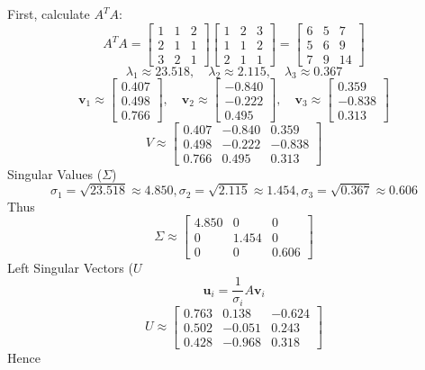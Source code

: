 \documentclass[DIV=20,oneside]{scrartcl}
\begin{document}
\begin{itemize}
	First, calculate $A^T A$:$$A^T A = \begin{bmatrix} 1 & 1 & 2 \\ 2 & 1 & 1 \\ 3 & 2 & 1 \end{bmatrix} \begin{bmatrix} 1 & 2 & 3 \\ 1 & 1 & 2 \\ 2 & 1 & 1 \end{bmatrix} = \begin{bmatrix} 6 & 5 & 7 \\ 5 & 6 & 9 \\ 7 & 9 & 14 \end{bmatrix}$$
	$$\lambda_1 \approx 23.518, \quad \lambda_2 \approx 2.115, \quad \lambda_3 \approx 0.367$$
	$$\mathbf{v}_1 \approx \begin{bmatrix} 0.407 \\ 0.498 \\ 0.766 \end{bmatrix}, \quad \mathbf{v}_2 \approx \begin{bmatrix} -0.840 \\ -0.222 \\ 0.495 \end{bmatrix}, \quad \mathbf{v}_3 \approx \begin{bmatrix} 0.359 \\ -0.838 \\ 0.313 \end{bmatrix}$$
	$$V \approx \begin{bmatrix} 0.407 & -0.840 & 0.359 \\ 0.498 & -0.222 & -0.838 \\ 0.766 & 0.495 & 0.313 \end{bmatrix}$$
	Singular Values ($\Sigma$)
	$$\sigma_1 = \sqrt{23.518} \approx 4.850, \sigma_2 = \sqrt{2.115} \approx 1.454, \sigma_3 = \sqrt{0.367} \approx 0.606$$ 
	Thus $$\Sigma \approx \begin{bmatrix} 4.850 & 0 & 0 \\ 0 & 1.454 & 0 \\ 0 & 0 & 0.606 \end{bmatrix}$$
	 Left Singular Vectors ($U$
	 $$\mathbf{u}_i = \frac{1}{\sigma_i} A \mathbf{v}_i$$
	 $$U \approx \begin{bmatrix} 0.763 & 0.138 & -0.624 \\ 0.502 & -0.051 & 0.243 \\ 0.428 & -0.968 & 0.318 \end{bmatrix}$$
	 Hence

\end{itemize}
\end{document}
